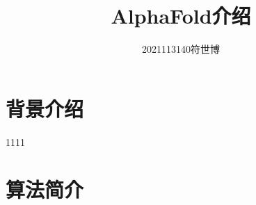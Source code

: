 \documentclass[withoutpreface,bwprint]{cumcmthesis}
\title{\textbf{AlphaFold介绍}}
\author{2021113140\quad 符世博}
\date{}
\begin{document}
\maketitle
\section{背景介绍}
1111
\section{算法简介}
\end{document}

